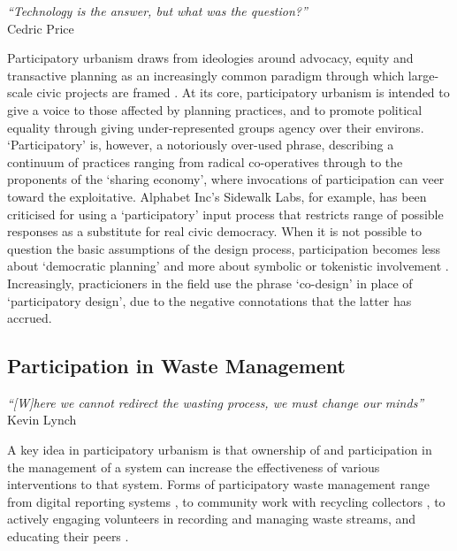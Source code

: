 \documentclass[nofonts,nols,justified,nobib]{tufte-book}
\begin{document}
\begin{flushright}
\emph{``Technology is the answer, but what was the question?''} \cite{price_technology_1979}\\
Cedric Price
\end{flushright}

Participatory urbanism draws from ideologies around advocacy, equity and transactive planning as an increasingly common paradigm through which large-scale civic projects are framed \cite{krivy_participatory_2013}. At its core, participatory urbanism is intended to give a voice to those affected by planning practices, and to promote political equality through giving under-represented groups agency over their environs. `Participatory' is, however, a notoriously over-used phrase, describing a continuum of practices ranging from radical co-operatives through to the proponents of the `sharing economy', where invocations of participation can veer toward the exploitative. Alphabet Inc's Sidewalk Labs, for example, has been criticised for using a `participatory' input process that restricts range of possible responses as a substitute for real civic democracy. When it is not possible to question the basic assumptions of the design process, participation becomes less about `democratic planning' and more about symbolic or tokenistic involvement \cite{arnstein_ladder_1969}. Increasingly, practicioners in the field use the phrase `co-design' in place of `participatory design', due to the negative connotations that the latter has accrued.

\subsection*{Participation in Waste Management}
\begin{flushright}
\emph{``[W]here we cannot redirect the wasting process, we must change our minds''}\cite{lynch_wasting_1990} \\
Kevin Lynch
\end{flushright}

A key idea in participatory urbanism is that ownership of and participation in the management of a system can increase the effectiveness of various interventions to that system. Forms of participatory waste management range from digital reporting systems \cite{offenhuber_waste_2017}, to community work with recycling collectors \cite{tremblay_united_2010, mundano_pimp_nodate}, to actively engaging volunteers in recording and managing waste streams, and educating their peers \cite{offenhuber_waste_2017}. 
\end{document}
